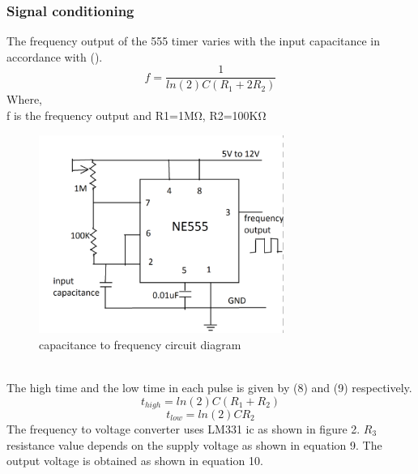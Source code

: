\documentclass[conference]{IEEEtran}
\begin{document}
\subsubsection{Signal conditioning}
The frequency output of the 555 timer varies with the input capacitance in accordance with ().\\
\begin{equation}\label{eq:3}
f=\frac{1}{ln (2)C(R_1+2R_2)}
\end{equation}
Where, \\
f is the frequency output and R1=1MΩ, R2=100KΩ
\begin{figure}[h]
\includegraphics[width=8cm]{ctof.png}
\centering
\caption{capacitance to frequency circuit diagram}\label{ctof_img}
\end{figure}
\\The high time and the low time in each pulse is given by (8) and (9) respectively.\\
\begin{equation} \label{eq:4}
t_{high}= ln(2)C(R_1+R_2)                    
\end{equation}
\begin{equation} \label{eq:5}
t_{low}= ln(2)CR_2                          
\end{equation}
The frequency to voltage converter uses LM331 ic as shown in figure 2. $R_3$ resistance value depends on the supply voltage as shown in equation 9. The output voltage is obtained as shown in equation 10.\\
\end{document}
